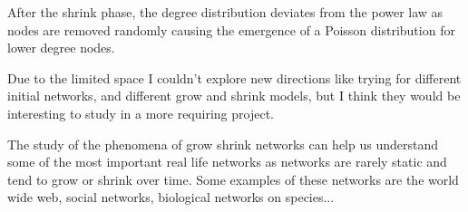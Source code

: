 After the shrink phase, the degree distribution deviates from the power law as nodes are removed randomly causing the emergence of a Poisson distribution for lower degree nodes.

Due to the limited space I couldn't explore new directions like trying for different initial networks, and different grow and shrink models, but I think they would be interesting to study in a more requiring project.

The study of the phenomena of grow shrink networks can help us understand some of the most important real life networks as networks are rarely static and tend to grow or shrink over time. Some examples of these networks are the world wide web, social networks, biological networks on species... 








